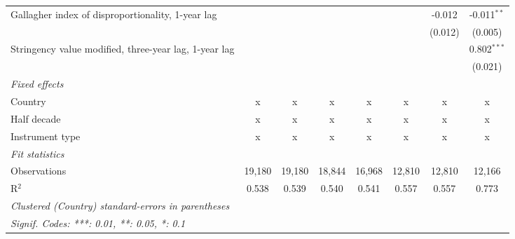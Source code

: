 \begin{table}[htbp]
\begin{tabular}{lccccccc}
      Gallagher index of disproportionality, 1-year lag     &         &         &              &               &               & -0.012        & -0.011$^{**}$\\   
                                                            &         &         &              &               &               & (0.012)       & (0.005)\\   
      Stringency value modified, three-year lag, 1-year lag &         &         &              &               &               &               & 0.802$^{***}$\\   
                                                            &         &         &              &               &               &               & (0.021)\\   
      \emph{Fixed effects}\\
      Country                                               & x       & x       & x            & x             & x             & x             & x\\  
      Half decade                                           & x       & x       & x            & x             & x             & x             & x\\  
      Instrument type                                       & x       & x       & x            & x             & x             & x             & x\\  
      \midrule \emph{Fit statistics}\\
      Observations                                          & 19,180  & 19,180  & 18,844       & 16,968        & 12,810        & 12,810        & 12,166\\  
      R$^2$                                                 & 0.538   & 0.539   & 0.540        & 0.541         & 0.557         & 0.557         & 0.773\\  
      \midrule
      \multicolumn{8}{l}{\emph{Clustered (Country) standard-errors in parentheses}}\\
      \multicolumn{8}{l}{\emph{Signif. Codes: ***: 0.01, **: 0.05, *: 0.1}}\\
   \end{tabular}
\end{table}


